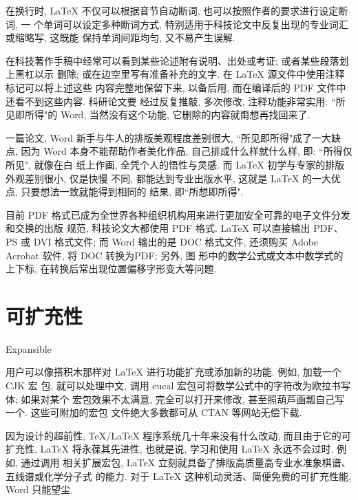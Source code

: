 在换行时, \LaTeX{}\index{\LaTeX} 不仅可以根据音节自动断词, 也可以按照作者的要求进行设定断词, 一
个单词可以设定多种断词方式, 特别适用于科技论文中反复出现的专业词汇或缩略写, 这既能
保持单词间距均匀, 又不易产生误解.

在科技著作手稿中经常可以看到某些论述附有说明、出处或考证; 或者某些段落划上黑杠以示
删除; 或在边空里写有准备补充的文字. 在 \LaTeX{}\index{\LaTeX} 源文件中使用注释标记可以将上述这些
内容完整地保留下来, 以备后用, 而在编译后的 PDF 文件中还看不到这些内容. 科研论文要
经过反复推敲, 多次修改, 注释功能非常实用. ``所见即所得"的 Word, 当然没有这个功能,
它删除的内容就甭想再找回来了.

一篇论文, Word 新手与牛人的排版美观程度差别很大, ``所见即所得"成了一大缺点, 因为
Word 本身不能帮助作者美化作品, 自己排成什么样就什么样, 即: ``所得仅所见", 就像在白
纸上作画, 全凭个人的悟性与灵感. 而 \LaTeX{}\index{\LaTeX} 初学与专家的排版外观差别很小, 仅是快慢
不同, 都能达到专业出版水平, 这就是 \LaTeX{}\index{\LaTeX} 的一大优点, 只要想法一致就能得到相同的
结果, 即``所想即所得".

目前 PDF 格式已成为全世界各种组织机构用来进行更加安全可靠的电子文件分发和交换的出版
规范, 科技论文大都使用 PDF 格式. \LaTeX{}\index{\LaTeX} 可以直接输出 PDF、PS 或 DVI 格式文件; 而
Word 输出的是 DOC 格式文件, 还须购买 Adobe Acrobat 软件, 将 DOC 转换为PDF; 另外, 图
形中的数学公式或文本中数学式的上下标, 在转换后常出现位置偏移字形变大等问题.

\section{可扩充性}{Expansible}

用户可以像搭积木那样对 \LaTeX{}\index{\LaTeX} 进行功能扩充或添加新的功能. 例如, 加载一个 CJK 宏
包, 就可以处理中文, 调用 eucal 宏包可将数学公式中的字符改为欧拉书写体; 如果对某个
宏包效果不太满意, 完全可以打开来修改, 甚至照葫芦画瓢自己写一个. 这些可附加的宏包
文件绝大多数都可从 CTAN 等网站无偿下载.

因为设计的超前性, \TeX/\LaTeX{}\index{\LaTeX} 程序系统几十年来没有什么改动, 而且由于它的可扩充性,
\LaTeX{}\index{\LaTeX} 将永葆其先进性, 也就是说, 学习和使用 \LaTeX{}\index{\LaTeX} 永远不会过时. 例如, 通过调用
相关扩展宏包, \LaTeX{}\index{\LaTeX} 立刻就具备了排版高质量高专业水准象棋谱、五线谱或化学分子式
的能力. 对于 \LaTeX{}\index{\LaTeX} 这种机动灵活、简便免费的可扩充性能, Word 只能望尘.

